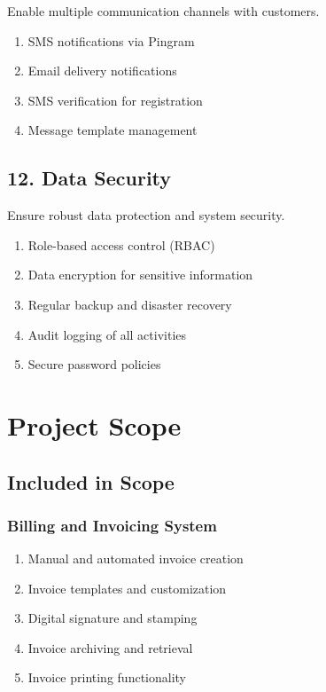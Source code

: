 \documentclass[12pt,a4paper]{report}
\begin{document}
Enable multiple communication channels with customers.

\begin{enumerate}[label=\roman*)]
    \item SMS notifications via Pingram
    \item Email delivery notifications
    \item SMS verification for registration
    \item Message template management
\end{enumerate}

\subsection{12. Data Security}

Ensure robust data protection and system security.

\begin{enumerate}[label=\roman*)]
    \item Role-based access control (RBAC)
    \item Data encryption for sensitive information
    \item Regular backup and disaster recovery
    \item Audit logging of all activities
    \item Secure password policies
\end{enumerate}

\section{Project Scope}

\subsection{Included in Scope}

\subsubsection{Billing and Invoicing System}
\begin{enumerate}[label=\roman*)]
    \item Manual and automated invoice creation
    \item Invoice templates and customization
    \item Digital signature and stamping
    \item Invoice archiving and retrieval
    \item Invoice printing functionality
\end{enumerate}
\end{document}
